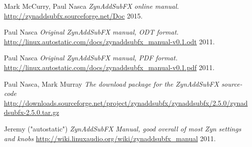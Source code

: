\begin{thebibliography}{99}
   Mark McCurry, Paul Nasca
   \emph{ZynAddSubFX online manual.}
   \url{http://zynaddsubfx.sourceforge.net/Doc}
   2015.

   Paul Nasca
   \emph{Original ZynAddSubFX manual, ODT format.}
   \url{http://linux.autostatic.com/docs/zynaddsubfx\_manual-v0.1.odt}
   2011.

   Paul Nasca
   \emph{Original ZynAddSubFX manual, PDF format.}
   \url{http://linux.autostatic.com/docs/zynaddsubfx\_manual-v0.1.pdf}
   2011.

   Paul Nasca, Mark Murray
   \emph{The download package for the ZynAddSubFX source-code}
   \url{http://downloads.sourceforge.net/project/zynaddsubfx/zynaddsubfx/2.5.0/zynaddsubfx-2.5.0.tar.gz}

   Jeremy ("autostatic")
   \emph{ZynAddSubFX Manual, good overall of most Zyn settings and knobs}
   \url{http://wiki.linuxaudio.org/wiki/zynaddsubfx_manual}
   2011.

\end{thebibliography}

